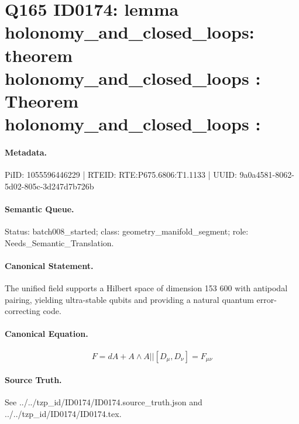 \section*{Q165 ID0174: lemma holonomy\_and\_closed\_loops: theorem holonomy\_and\_closed\_loops : Theorem holonomy\_and\_closed\_loops :}
\paragraph{Metadata.}
PiID: 1055596446229 | RTEID: RTE:P675.6806:T1.1133 | UUID: 9a0a4581-8062-5d02-805c-3d247d7b726b

\paragraph{Semantic Queue.}
Status: batch008\_started; class: geometry\_manifold\_segment; role: Needs\_Semantic\_Translation.

\paragraph{Canonical Statement.}
The unified field supports a Hilbert space of dimension 153 600 with antipodal pairing, yielding ultra-stable qubits and providing a natural quantum error-correcting code.

\paragraph{Canonical Equation.}
\[
F = dA + A\wedge A || [D_\mu, D_\nu] = F_{\mu\nu}
\]

\paragraph{Source Truth.}
See ../../tzp\_id/ID0174/ID0174.source\_truth.json and ../../tzp\_id/ID0174/ID0174.tex.
